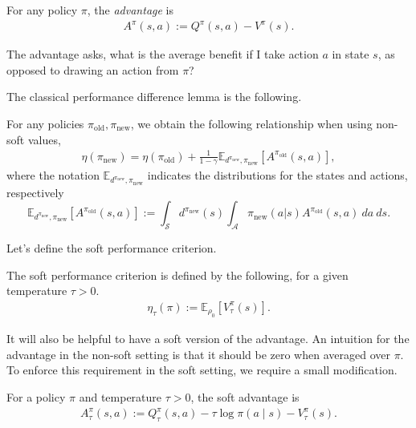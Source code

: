\documentclass[twoside,11pt]{article}
\newcommand{\Ex}{\mathbb{E}}
\newcommand{\statespace}{\mathcal{S}}
\newcommand{\actionspace}{\mathcal{A}}
\newcommand{\entropy}{\mathcal{H}}
\newcommand{\pinew}{{\pi_\mathrm{new}}}
\newcommand{\piold}{{\pi_\mathrm{old}}}
\newcommand{\defeq}{:=}
\begin{document}
\begin{definition}[Advantage]\label{def:advantage}
For any policy $\pi$, the \textit{advantage} is 
\begin{align*}
    A^\pi(s, a) := Q^\pi(s, a) - V^\pi(s).
\end{align*}
\end{definition}
The advantage asks, what is the average benefit if I take action $a$ in state $s$, as opposed to drawing an action from $\pi$?

The classical performance difference lemma is the following. 
\begin{lemma}\label{lemma:perf-diff}
For any policies $\piold, \pinew$, we obtain the following relationship when using non-soft values, 
\begin{align*}
    \eta(\pinew) = \eta(\piold) + \frac{1}{1 - \gamma} \Ex_{d^{\pinew}, \pinew}[A^{\piold}(s, a)],
\end{align*}
where the notation $\Ex_{d^{\pinew}, \pinew}$ indicates the distributions for the states and actions, respectively 
\begin{equation*}
 \Ex_{d^{\pinew}, \pinew}[A^{\piold}(s, a)] \defeq \int_{\statespace} d^{\pinew}(s) \int_{\actionspace} \pinew(a | s) A^{\piold}(s,a) \ da \ ds.
\end{equation*}
%
\end{lemma}
\noindent Let's define the soft performance criterion. 
\begin{definition}\label{def:soft-performance}
The soft performance criterion is defined by the following, for a given temperature $\tau > 0$.
\begin{align*}
    \eta_\tau(\pi) := \Ex_{\rho_0}[V^\pi_\tau(s)].
\end{align*}
\end{definition}
It will also be helpful to have a soft version of the advantage. An intuition for the advantage in the non-soft setting is that it should be zero when averaged over $\pi$. To enforce this requirement in the soft setting, we require a small modification.
\begin{definition}\label{def:soft-advantage}
For a policy $\pi$ and temperature $\tau > 0$, the soft advantage is
\begin{align*}
    A^\pi_\tau(s, a) := Q^\pi_\tau(s, a) - \tau \log \pi(a \mid s) - V^\pi_\tau(s).
\end{align*}
\end{definition}
\end{document}
